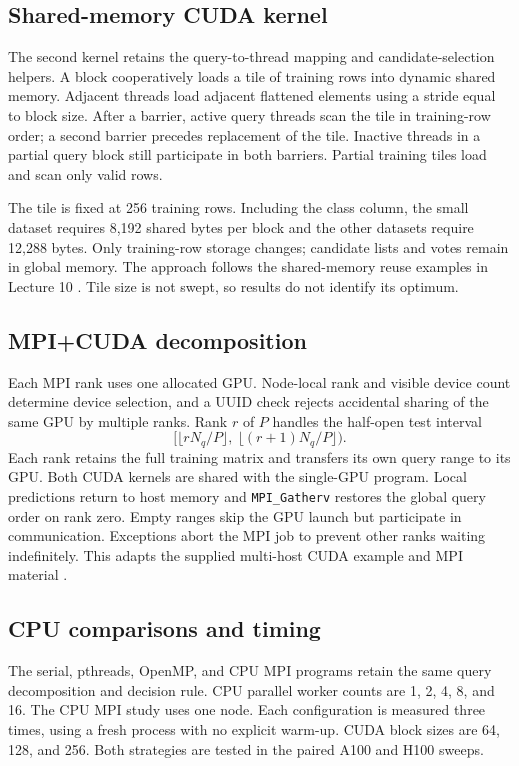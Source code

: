 \documentclass[conference]{IEEEtran}
\begin{document}
\subsection{Shared-memory CUDA kernel}
The second kernel retains the query-to-thread mapping and candidate-selection helpers. A block cooperatively loads a tile of training rows into dynamic shared memory. Adjacent threads load adjacent flattened elements using a stride equal to block size. After a barrier, active query threads scan the tile in training-row order; a second barrier precedes replacement of the tile. Inactive threads in a partial query block still participate in both barriers. Partial training tiles load and scan only valid rows.

The tile is fixed at 256 training rows. Including the class column, the small dataset requires 8,192 shared bytes per block and the other datasets require 12,288 bytes. Only training-row storage changes; candidate lists and votes remain in global memory. The approach follows the shared-memory reuse examples in Lecture 10 \cite{cuda10}. Tile size is not swept, so results do not identify its optimum.

\subsection{MPI+CUDA decomposition}
Each MPI rank uses one allocated GPU. Node-local rank and visible device count determine device selection, and a UUID check rejects accidental sharing of the same GPU by multiple ranks. Rank $r$ of $P$ handles the half-open test interval
\begin{equation}
[\lfloor rN_q/P\rfloor,\ \lfloor(r+1)N_q/P\rfloor).
\end{equation}
Each rank retains the full training matrix and transfers its own query range to its GPU. Both CUDA kernels are shared with the single-GPU program. Local predictions return to host memory and \texttt{MPI\_Gatherv} restores the global query order on rank zero. Empty ranges skip the GPU launch but participate in communication. Exceptions abort the MPI job to prevent other ranks waiting indefinitely. This adapts the supplied multi-host CUDA example and MPI material \cite{cuda13,mpi6}.

\subsection{CPU comparisons and timing}
The serial, pthreads, OpenMP, and CPU MPI programs retain the same query decomposition and decision rule. CPU parallel worker counts are 1, 2, 4, 8, and 16. The CPU MPI study uses one node. Each configuration is measured three times, using a fresh process with no explicit warm-up. CUDA block sizes are 64, 128, and 256. Both strategies are tested in the paired A100 and H100 sweeps.
\end{document}
